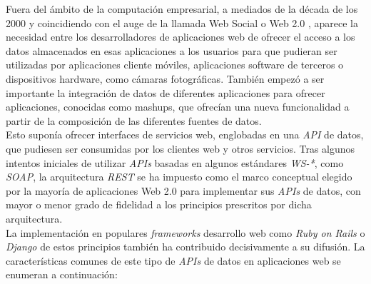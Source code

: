 Fuera del \'ambito de la computaci\'on empresarial, a mediados de la d\'ecada de los 2000 y coincidiendo con el auge de la llamada Web Social o Web 2.0 \cite{murugesan2007understanding}, aparece la necesidad entre los desarrolladores de aplicaciones web de ofrecer el acceso a los datos almacenados en esas aplicaciones a los usuarios para que pudieran ser utilizadas por aplicaciones cliente m\'oviles, aplicaciones software de terceros o dispositivos hardware, como c\'amaras fotogr\'aficas. Tambi\'en empez\'o a ser importante la integraci\'on de datos de diferentes aplicaciones para ofrecer aplicaciones, conocidas como mashups, que ofrec\'ian una nueva funcionalidad a partir de la composici\'on de las diferentes fuentes de datos.\\

Esto supon\'ia ofrecer interfaces de servicios web, englobadas en una \textit{API} de datos, que pudiesen ser consumidas por los clientes web y otros servicios. Tras algunos intentos iniciales de utilizar \textit{APIs} basadas en algunos est\'andares \textit{WS-*}, como \textit{SOAP}, la arquitectura \textit{REST} se ha impuesto como el marco conceptual elegido por la mayor\'ia de aplicaciones Web 2.0 para implementar sus \textit{APIs} de datos, con mayor o menor grado de fidelidad a los principios prescritos por dicha arquitectura.\\

La  implementaci\'on en populares \textit{frameworks} desarrollo web como \textit{Ruby on Rails} o \textit{Django} de estos principios tambi\'en ha contribuido decisivamente a su difusi\'on.
La caracter\'isticas comunes de este tipo de \textit{APIs} de datos en aplicaciones web se enumeran a continuaci\'on:


